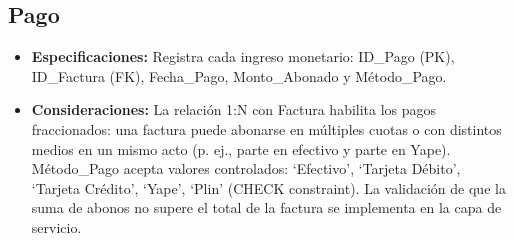\subsection{Pago}

\begin{itemize}
	\item \textbf{Especificaciones:} Registra cada ingreso monetario: ID\_Pago (PK), ID\_Factura (FK), Fecha\_Pago, Monto\_Abonado y Método\_Pago.
	\item \textbf{Consideraciones:} La relación 1:N con Factura habilita los pagos fraccionados: una factura puede abonarse en múltiples cuotas o con distintos medios en un mismo acto (p. ej., parte en efectivo y parte en Yape). Método\_Pago acepta valores controlados: `Efectivo', `Tarjeta Débito', `Tarjeta Crédito', `Yape', `Plin' (CHECK constraint). La validación de que la suma de abonos no supere el total de la factura se implementa en la capa de servicio.
\end{itemize}
